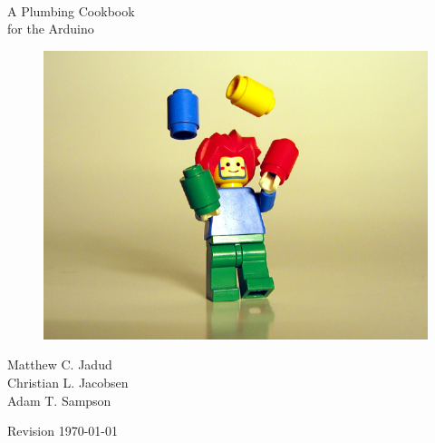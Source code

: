  
\vspace{-3cm}
\fontsize{42}{42}\selectfont 
\begin{center}
\HRule \\
A Plumbing Cookbook \\
for the Arduino\vspace{-1cm}
\HRule
\end{center}

\normalsize
\pagestyle{empty}

\begin{figure}[bph]
  \begin{center}
    \includegraphics[width=0.8\linewidth]{images/juggling}
  \end{center}
\end{figure}

\begin{center}
	Matthew C. Jadud\\
	Christian L. Jacobsen\\
	Adam T. Sampson
\end{center}

\thispagestyle{empty}

\newpage

\begin{center}
\vspace*{\fill}
Revision \Ymd\today
\end{center}

\vspace*{\fill}

\newpage